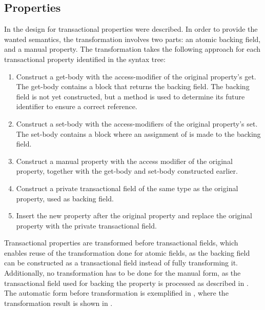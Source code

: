 \subsection{Properties}\label{sec:roslyn_extension_properties}
In  the design for transactional properties were described. In order to provide the wanted semantics, the transformation involves two parts: an atomic backing field, and a manual property. The transformation takes the following approach for each transactional property identified in the syntax tree:

\begin{enumerate}
	\item Construct a get-body with the access-modifier of the original property's get. The get-body contains a block that returns the backing field. The backing field is not yet constructed, but a method is used to determine its future identifier to ensure a correct reference.
	\item Construct a set-body with the access-modifiers of the original property's set. The set-body contains a block where an assignment of  is made to the backing field.
	\item Construct a manual property with the access modifier of the original property, together with the get-body and set-body constructed earlier.
	\item Construct a private transactional field of the same type as the original property, used as backing field.
	\item Insert the new property after the original property and replace the original property with the private transactional field.
\end{enumerate}

Transactional properties are transformed before transactional fields, which enables reuse of the transformation done for atomic fields, as the backing field can be constructed as a transactional field instead of fully transforming it. Additionally, no transformation has to be done for the manual form, as the transactional field used for backing the property is processed as described in . The automatic form before transformation is exemplified in , where the transformation result is shown in .

